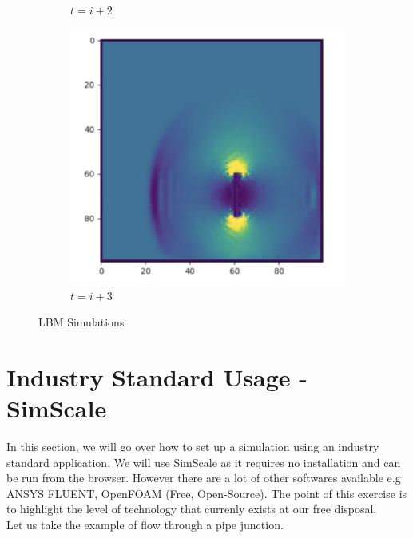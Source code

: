 \documentclass[12pt]{article}
\begin{document}
\begin{figure}[htbp]
\begin{subfigure}[b]{0.45\textwidth}
        \caption{$t=i+2$}
        \label{fig:image3}
    \end{subfigure}
    \hfill
    \begin{subfigure}[b]{0.45\textwidth}
        \centering
        \includegraphics[width=0.6 \linewidth]{plot16.png}
        \caption{$t=i+3$}
        \label{fig:image4}
    \end{subfigure}
    \caption{LBM Simulations}
    \label{fig:images}
\end{figure}
\clearpage
\section{Industry Standard Usage - SimScale}
In this section, we will go over how to set up a simulation using an industry standard application. We will use SimScale as it requires no installation and can be run from the browser. However there are a lot of other softwares available e.g ANSYS FLUENT, OpenFOAM (Free, Open-Source). The point of this exercise is to highlight the level of technology that currenly exists at our free disposal. \cite{bib13} \\

Let us take the example of flow through a pipe junction. \\
\end{document}
